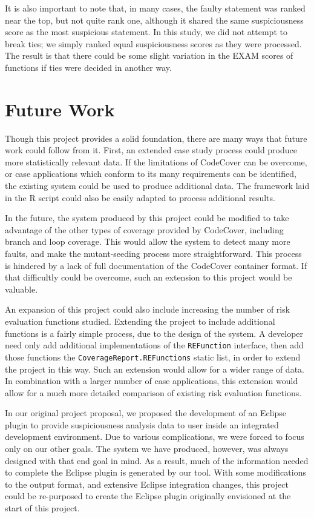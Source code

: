 It is also important to note that, in many cases, the faulty statement was ranked near 
the top, but not quite rank one, although it shared the same suspiciousness score as
the most suspicious statement.  In this study, we did not attempt to break ties; we simply
ranked equal suspiciousness scores as they were processed.  The result is that there could
be some slight variation in the EXAM scores of functions if ties were decided in another way.

\section{Future Work}\label{sec:future}

Though this project provides a solid foundation, there are many ways that future work
could follow from it.  First, an extended case study process could produce more statistically
relevant data.  If the limitations of CodeCover can be overcome, or case applications which
conform to its many requirements can be identified, the existing system could be used to
produce additional data.  The framework laid in the R script could also be easily adapted to
process additional results.  

In the future, the system produced by this project could be modified to take advantage of the
other types of coverage provided by CodeCover, including branch and loop coverage.  This would
allow the system to detect many more faults, and make the mutant-seeding process more
straightforward.  This process is hindered by a lack of full documentation of the CodeCover 
container format.  If that difficultly could be overcome, such an extension to this project
would be valuable.

An expansion of this project could also include increasing the number of risk evaluation
functions studied.  Extending the project to include additional functions is a fairly simple
process, due to the design of the system.  A developer need only add additional implementations
of the \texttt{REFunction} interface, then add those functions the \texttt{CoverageReport.REFunctions}
static list, in order to extend the project in this way.  Such an extension would allow for 
a wider range of data.  In combination with a larger number of case applications, this
extension would allow for a much more detailed comparison of existing risk evaluation functions.

In our original project proposal, we proposed the development of an Eclipse plugin to provide
suspiciousness analysis data to user inside an integrated development environment.  Due to
various complications, we were forced to focus only on our other goals.  The system we have
produced, however, was always designed with that end goal in mind.  As a result, much of the
information needed to complete the Eclipse plugin is generated by our tool.  With some 
modifications to the output format, and extensive Eclipse integration changes, this project
could be re-purposed to create the Eclipse plugin originally envisioned at the start of this
project.  

